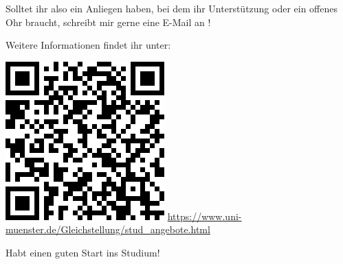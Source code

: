 \begin{multicols}{2}
Solltet ihr also ein Anliegen haben, bei dem ihr Unterstützung oder ein offenes Ohr braucht, schreibt mir gerne eine E-Mail an ! 

Weitere Informationen findet ihr unter: 
\begin{center}
  \includegraphics[width=0.7\columnwidth]{res/StudzGB.png}
  \smallskip
  \url{https://www.uni-muenster.de/Gleichstellung/stud\_angebote.html} 
\end{center}

Habt einen guten Start ins Studium!
 
 
\end{multicols}
